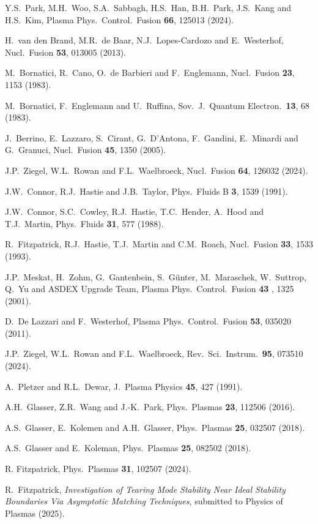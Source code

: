 \documentclass[12pt,prb,aps]{revtex4-1}
\begin{document}
\begin{thebibliography}{99}
 Y.S.~Park, M.H.~Woo, S.A.~Sabbagh, H.S.~Han, B.H.~Park, J.S.~Kang and H.S.~Kim,  Plasma Phys.\ Control.\ Fusion {\bf 66}, 125013 (2024).

 H.~van den Brand, M.R.~de Baar, N.J.~Lopes-Cardozo and E.~Westerhof, Nucl.\ Fusion {\bf 53}, 013005 (2013). 
  
 M.~Bornatici, R.~Cano, O.~de Barbieri and F.~Englemann, Nucl.\ Fusion {\bf 23}, 1153 (1983). 

 M.~Bornatici, F.~Englemann and U.~Ruffina, Sov.\ J.\ Quantum Electron.\ {\bf 13}, 68 (1983).

 J.~Berrino, E.~Lazzaro, S.~Cirant, G.~D'Antona, F.~Gandini, E.~Minardi and G.~Granuci, Nucl.\ Fusion {\bf 45}, 1350 (2005).

 J.P.~Ziegel, W.L.~Rowan and F.L.~Waelbroeck, Nucl.\ Fusion {\bf 64}, 126032 (2024).

 J.W.~Connor, R.J.~Hastie and J.B.~Taylor, Phys.\ Fluids B {\bf 3}, 1539 (1991).

 J.W.~Connor,  S.C.~Cowley, R.J.~Hastie,  T.C.~Hender,  A.~Hood  and T.J.~Martin,  Phys.\ Fluids {\bf 31}, 577 (1988).

 R.~Fitzpatrick, R.J.~Hastie, T.J.~Martin and C.M.~Roach, Nucl.\ Fusion {\bf 33}, 1533 (1993).

 J.P.~Meskat, H.~Zohm, G.~Gantenbein, S.~G\"{u}nter, M.~Maraschek, W.~Suttrop, Q.~Yu and ASDEX Upgrade Team, Plasma Phys.\ Control.\ Fusion {\bf 43} , 1325 (2001).

 D.~De Lazzari and F.~Westerhof, Plasma Phys.\ Control.\ Fusion {\bf 53}, 035020 (2011).

 J.P.~Ziegel, W.L.~Rowan and F.L.~Waelbroeck, Rev.\ Sci.\ Instrum.\ {\bf 95}, 073510 (2024).

 A.~Pletzer and R.L.~Dewar, J.\ Plasma Physics {\bf 45}, 427 (1991).

 A.H.~Glasser, Z.R.~Wang and J.-K.~Park, Phys.\ Plasmas {\bf 23}, 112506 (2016).

 A.S.~Glasser, E.~Kolemen and A.H.~Glasser, Phys.\ Plasmas {\bf 25}, 032507 (2018).

 A.S.~Glasser and E.~Koleman, Phys.\ Plasmas {\bf 25}, 082502 (2018). 

 R. Fitzpatrick, Phys.\ Plasmas {\bf 31}, 102507 (2024).

 R.~Fitzpatrick,  {\em Investigation of  Tearing Mode Stability Near Ideal Stability Boundaries Via Asymptotic Matching Techniques}, submitted
to Physics of Plasmas (2025).


\end{thebibliography}
\end{document}
